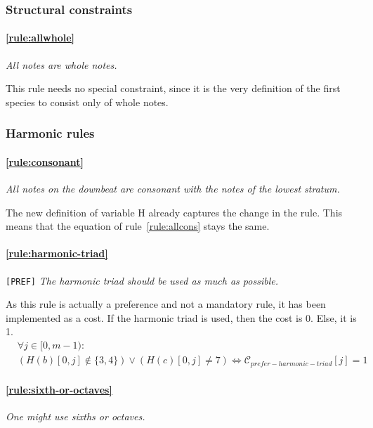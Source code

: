 \subsubsection{Structural constraints}
    \paragraph{\hspace{0.6cm}\ref{rule:allwhole}} \textit{All notes are whole notes.}
    
    This rule needs no special constraint, since it is the very definition of the first species to consist only of whole notes.

\subsubsection{Harmonic rules}
\paragraph{\hspace{.6cm}\ref{rule:consonant}} \greendots \textit{All notes on the downbeat are consonant with the notes of the lowest stratum.}
    
    The new definition of variable H already captures the change in the rule. This means that the equation of rule~\ref{rule:allcons} stays the same.
    \paragraph{\hspace{.6cm}\ref{rule:harmonic-triad}} \texttt{[PREF]} \textit{The harmonic triad should be used as much as possible.}
    
    As this rule is actually a preference and not a mandatory rule, it has been implemented as a cost. If the harmonic triad is used, then the cost is 0. Else, it is 1.
    \begin{equation}
    \begin{aligned}
    &\forall j \in [0, m-1) \colon \\
    &(H(b)[0,j] \notin \{3, 4\}) \lor (H(c)[0, j]  \neq 7) \iff \mathcal{C}_{\mathit{prefer-harmonic-triad}}[j] = 1
    \end{aligned}
    \end{equation}

    \paragraph{\hspace{.6cm}\ref{rule:sixth-or-octaves}}  \textit{One might use sixths or octaves.}

